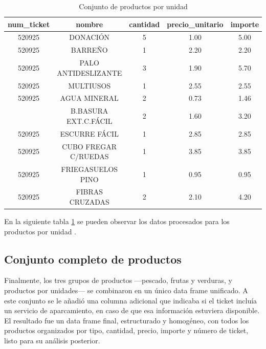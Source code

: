 \documentclass[,article,submit,moreauthors,pdftex]{Definitions/mdpi}
\begin{document}
\begin{table}

\caption{\label{tab:tabla_productos_unidad}Conjunto de productos por unidad}
\centering
\begin{tabular}[t]{ccccc}
\toprule
num\_ticket & nombre & cantidad & precio\_unitario & importe\\
\midrule
520925 & DONACIÓN & 5 & 1.00 & 5.00\\
520925 & BARREÑO & 1 & 2.20 & 2.20\\
520925 & PALO ANTIDESLIZANTE & 3 & 1.90 & 5.70\\
520925 & MULTIUSOS & 1 & 2.55 & 2.55\\
520925 & AGUA MINERAL & 2 & 0.73 & 1.46\\
\addlinespace
520925 & B.BASURA EXT.C.FÁCIL & 2 & 1.60 & 3.20\\
520925 & ESCURRE FÁCIL & 1 & 2.85 & 2.85\\
520925 & CUBO FREGAR C/RUEDAS & 1 & 3.85 & 3.85\\
520925 & FRIEGASUELOS PINO & 1 & 0.95 & 0.95\\
520925 & FIBRAS CRUZADAS & 2 & 2.10 & 4.20\\
\bottomrule
\end{tabular}
\end{table}

En la siguiente tabla \ref{tab:tabla_productos_unidad} se pueden
observar los datos procesados para los productos por unidad .

\hypertarget{conjunto-completo-de-productos}{%
\subsection{Conjunto completo de
productos}\label{conjunto-completo-de-productos}}

Finalmente, los tres grupos de productos ---pescado, frutas y verduras,
y productos por unidades--- se combinaron en un único data frame
unificado. A este conjunto se le añadió una columna adicional que
indicaba si el ticket incluía un servicio de aparcamiento, en caso de
que esa información estuviera disponible. El resultado fue un data frame
final, estructurado y homogéneo, con todos los productos organizados por
tipo, cantidad, precio, importe y número de ticket, listo para su
análisis posterior.
\end{document}
